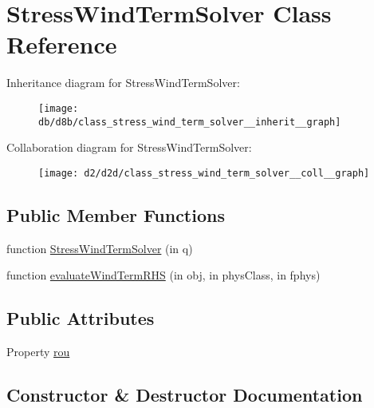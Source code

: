 \hypertarget{class_stress_wind_term_solver}{}\section{Stress\+Wind\+Term\+Solver Class Reference}
\label{class_stress_wind_term_solver}


Inheritance diagram for Stress\+Wind\+Term\+Solver\+:
\nopagebreak
\begin{figure}[H]
\begin{center}
\leavevmode
\texttt{[image: db/d8b/class\_stress\_wind\_term\_solver\_\_inherit\_\_graph]}
\end{center}
\end{figure}


Collaboration diagram for Stress\+Wind\+Term\+Solver\+:
\nopagebreak
\begin{figure}[H]
\begin{center}
\leavevmode
\texttt{[image: d2/d2d/class\_stress\_wind\_term\_solver\_\_coll\_\_graph]}
\end{center}
\end{figure}
\subsection*{Public Member Functions}
\begin{DoxyCompactItemize}
\item 
function \hyperlink{class_stress_wind_term_solver_a077ae356d692945bc94f25c94fff198e}{Stress\+Wind\+Term\+Solver} (in q)
\item 
function \hyperlink{class_stress_wind_term_solver_a7be11e02bea4ecf1bba0da1835506fe9}{evaluate\+Wind\+Term\+R\+HS} (in obj, in phys\+Class, in fphys)
\end{DoxyCompactItemize}
\subsection*{Public Attributes}
\begin{DoxyCompactItemize}
\item 
Property \hyperlink{class_stress_wind_term_solver_a2463aef14468b039e1ca130f7fc69240}{rou}
\end{DoxyCompactItemize}


\subsection{Constructor \& Destructor Documentation}
\mbox{\label{class_stress_wind_term_solver_a077ae356d692945bc94f25c94fff198e}} 

